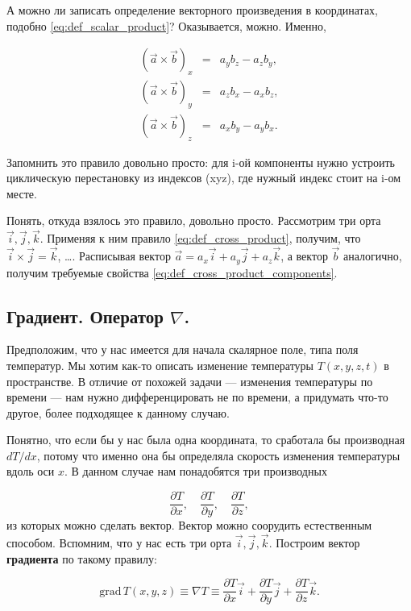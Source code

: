 \documentclass[a4paper,12pt]{article}
\numberwithin{equation}{section}
\newcommand{\nn}{\nonumber}
\newcommand{\pt}{\partial}
\newcommand{\grad}{\mathrm{grad}\,}
\begin{document}
А можно ли записать определение векторного произведения в координатах,
подобно \eqref{eq:def_scalar_product}? Оказывается, можно. Именно, 

\begin{eqnarray}
  \label{eq:def_cross_product_components}
  \nn
  (\vec{a} \times \vec{b})_x &=& a_y b_z -a_z b_y,\\
  (\vec{a} \times \vec{b})_y &=& a_z b_x -a_x b_z,\\
  \nn
  (\vec{a} \times \vec{b})_z &=& a_x b_y -a_y b_x.
\end{eqnarray}

Запомнить это правило довольно просто: для i-ой компоненты нужно
устроить циклическую перестановку из индексов (xyz), где нужный индекс
стоит на i-ом месте. 

Понять, откуда взялось это правило, довольно просто. Рассмотрим три
орта $\vec{i},\vec{j},\vec{k}$. Применяя к ним правило
\eqref{eq:def_cross_product}, получим, что $\vec{i} \times \vec{j} =
\vec{k}$, \ldots. Расписывая вектор $\vec{a} = a_x \vec{i} + a_y
\vec{j} + a_z \vec{k}$, а вектор $\vec{b}$ аналогично, получим
требуемые свойства \eqref{eq:def_cross_product_components}. 

\subsection{Градиент. Оператор $\nabla$.}
\label{sec:gradient}

Предположим, что у нас имеется для начала скалярное поле, типа поля
температур. Мы хотим как-то описать изменение температуры $T(x,y,z,t)$
в пространстве. В отличие от похожей задачи --- изменения температуры
по времени --- нам нужно дифференцировать не по времени, а придумать
что-то другое, более подходящее к данному случаю.

Понятно, что если бы у нас была одна координата, то сработала бы
производная $dT/dx$, потому что именно она бы определяла скорость
изменения температуры вдоль оси $x$. В данном случае нам понадобятся
три производных 

\begin{equation}
  \label{eq:def_grad_1}
  \frac{\pt T}{\pt x}, \quad   \frac{\pt T}{\pt y}, \quad   \frac{\pt
    T}{\pt z},
\end{equation}
из которых можно сделать вектор. Вектор можно соорудить естественным
способом. Вспомним, что у нас есть три орта
$\vec{i},\vec{j},\vec{k}$. Построим вектор \textbf{градиента} по такому
правилу:

\begin{equation}
  \label{eq:def_grad_2}
  \grad T (x,y,z) \equiv \nabla T \equiv \frac{\pt T}{\pt x} \vec{i} +  \frac{\pt T}{\pt y}
  \vec{j} +  \frac{\pt T}{\pt z} \vec{k}.
\end{equation}
\end{document}
